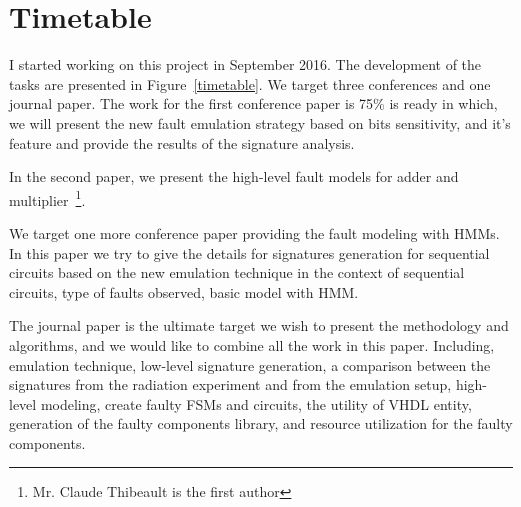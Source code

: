 \section{Timetable}
I started working on this project in September 2016. 
The development of the tasks are presented in Figure~\ref{timetable}. We target three conferences and one journal paper. The work for the first conference paper is 75\% is ready in which, we will present the new fault emulation strategy based on bits sensitivity, and it's feature and provide the results of the signature analysis.

In the second paper, we present the high-level fault models for adder and multiplier~\footnote{Mr. Claude Thibeault is the first author}. 

We target one more conference paper providing the fault modeling with HMMs. In this paper we try to give the details for signatures generation for sequential circuits based on the new emulation technique in the context of sequential circuits, type of faults observed, basic model with HMM.



The journal paper is the ultimate target we wish to present the methodology and algorithms, and we would like to combine all the work in this paper. Including, emulation technique, low-level signature generation, a comparison between the signatures from the radiation experiment and from the emulation setup, high-level modeling, create faulty FSMs and circuits, the utility of  VHDL entity, generation of the faulty components library, and resource utilization for the faulty components.  


